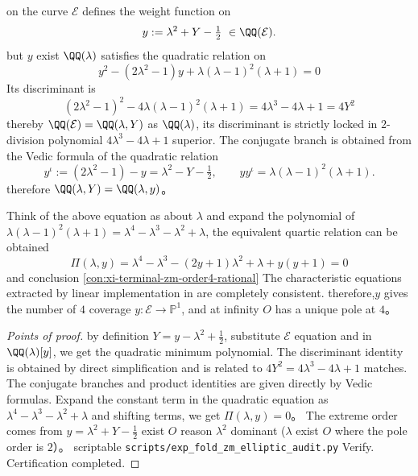 \begin{conclusion}\label{con:xi-terminal-zm-elliptic-quadratic-discriminant}
on the curve \(\mathcal{E}\) defines the weight function on
\[
y:=\lambda^{2}+Y-\tfrac12\ \in\QQ(\mathcal{E}).
\]
but \(y\) exist \(\QQ(\lambda)\) satisfies the quadratic relation on
\[
\boxed{\;
y^{2}-(2\lambda^{2}-1)y+\lambda(\lambda-1)^{2}(\lambda+1)=0\;}
\]
Its discriminant is
\[
\boxed{\;
(2\lambda^{2}-1)^{2}-4\lambda(\lambda-1)^{2}(\lambda+1)=4\lambda^{3}-4\lambda+1=4Y^{2}\;}
\]
thereby \(\QQ(\mathcal{E})=\QQ(\lambda,Y)\) as \(\QQ(\lambda)\), its discriminant is strictly locked in \(2\)-division polynomial \(4\lambda^{3}-4\lambda+1\) superior.
The conjugate branch is obtained from the Vedic formula of the quadratic relation
\[
y^{\iota}:=(2\lambda^{2}-1)-y=\lambda^{2}-Y-\tfrac12,
\qquad
yy^{\iota}=\lambda(\lambda-1)^{2}(\lambda+1).
\]
therefore \(\QQ(\lambda,Y)=\QQ(\lambda,y)\)。
\par
Think of the above equation as about \(\lambda\) and expand the polynomial of \(\lambda(\lambda-1)^{2}(\lambda+1)=\lambda^{4}-\lambda^{3}-\lambda^{2}+\lambda\), the equivalent quartic relation can be obtained
\[
\boxed{\;
\Pi(\lambda,y)=\lambda^{4}-\lambda^{3}-(2y+1)\lambda^{2}+\lambda+y(y+1)=0\;}
\]
and conclusion \ref{con:xi-terminal-zm-order4-rational} The characteristic equations extracted by linear implementation in are completely consistent.
therefore,\(y\) gives the number of \(4\) coverage \(y:\mathcal{E}\to\mathbb{P}^{1}\), and at infinity \(O\) has a unique pole at \(4\)。
\end{conclusion}
\begin{proof}[Points of proof]
by definition \(Y=y-\lambda^{2}+\tfrac12\), substitute \(\mathcal{E}\) equation and in \(\QQ(\lambda)[y]\), we get the quadratic minimum polynomial.
The discriminant identity is obtained by direct simplification and is related to \(4Y^{2}=4\lambda^{3}-4\lambda+1\) matches.
The conjugate branches and product identities are given directly by Vedic formulas.
Expand the constant term in the quadratic equation as \(\lambda^{4}-\lambda^{3}-\lambda^{2}+\lambda\) and shifting terms, we get \(\Pi(\lambda,y)=0\)。
The extreme order comes from \(y=\lambda^{2}+Y-\tfrac12\) exist \(O\) reason \(\lambda^{2}\) dominant (\(\lambda\) exist \(O\) where the pole order is \(2\)）。
scriptable \texttt{scripts/exp\_fold\_zm\_elliptic\_audit.py} Verify. Certification completed.
\end{proof}

